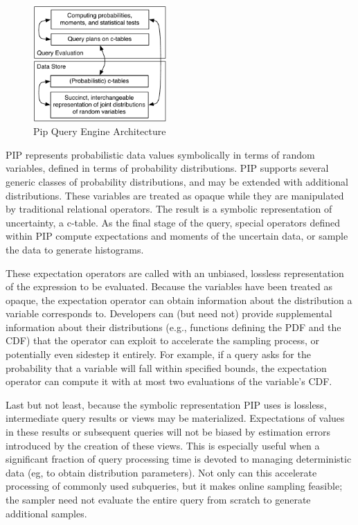 %
\begin{figure}
\begin{center}
\includegraphics[width=2in]{graphics/arch.pdf}
\vspace*{-0.1in}
\caption{Pip Query Engine Architecture}
\label{fig:arch}
\end{center}
\vspace*{-0.35in}
\end{figure}

PIP represents probabilistic data values symbolically in terms of random variables, defined in terms of probability distributions.  PIP supports several generic classes of probability distributions, and may be extended with additional distributions.  These variables are treated as opaque while they are manipulated by traditional relational operators.  The result is a symbolic representation of uncertainty, a c-table.  As the final stage of the query, special operators defined within PIP compute expectations and moments of the uncertain data, or sample the data to generate histograms.  

These expectation operators are called with an unbiased, lossless representation of the expression to be evaluated.  Because the variables have been treated as opaque, the expectation operator can obtain information about the distribution a variable corresponds to.  Developers can (but need not) provide supplemental information about their distributions (e.g., functions defining the PDF and the CDF) that the operator can exploit to accelerate the sampling process, or potentially even sidestep it entirely.  For example, if a query asks for the probability that a variable will fall within specified bounds, the expectation operator can compute it with at most two evaluations of the variable's CDF.

Last but not least, because the symbolic representation PIP uses is lossless, intermediate query results or views may be materialized.  Expectations of values in these results or subsequent queries will not be biased by estimation errors introduced by the creation of these views.  This is especially useful when a significant fraction of query processing time is devoted to managing deterministic data (eg, to obtain distribution parameters).  Not only can this accelerate processing of commonly used subqueries, but it makes online sampling feasible; the sampler need not evaluate the entire query from scratch to generate additional samples.


